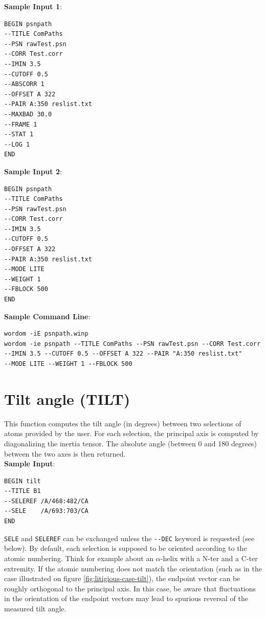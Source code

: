 \documentclass[11pt,twoside,onecolumn,a4paper,openright,notitlepage]{book}[2001/04/21]
\begin{document}
\textbf{\large Sample Input 1}:
\begin{verbatim}
BEGIN psnpath
--TITLE ComPaths
--PSN rawTest.psn
--CORR Test.corr
--IMIN 3.5
--CUTOFF 0.5
--ABSCORR 1
--OFFSET A 322
--PAIR A:350 reslist.txt
--MAXBAD 30.0
--FRAME 1
--STAT 1
--LOG 1
END
\end{verbatim}

\textbf{\large Sample Input 2}:
\begin{verbatim}
BEGIN psnpath
--TITLE ComPaths
--PSN rawTest.psn
--CORR Test.corr
--IMIN 3.5
--CUTOFF 0.5
--OFFSET A 322
--PAIR A:350 reslist.txt
--MODE LITE
--WEIGHT 1
--FBLOCK 500
END
\end{verbatim}

\textbf{\large Sample Command Line}:
\begin{verbatim}
wordom -iE psnpath.winp
wordom -ie psnpath --TITLE ComPaths --PSN rawTest.psn --CORR Test.corr 
--IMIN 3.5 --CUTOFF 0.5 --OFFSET A 322 --PAIR "A:350 reslist.txt" 
--MODE LITE --WEIGHT 1 --FBLOCK 500
\end{verbatim}

\clearpage


\section{Tilt angle (TILT)}

This function computes the tilt angle (in degrees) between two selections of atoms provided by the user. For each selection, the principal axis is computed by diagonalizing the inertia tensor. The absolute angle (between 0 and 180 degrees) between the two axes is then returned.\\

\textbf{\large Sample Input}:
\begin{verbatim}
BEGIN tilt
--TITLE B1
--SELEREF /A/468:482/CA
--SELE    /A/693:703/CA
END
\end{verbatim}

\verb!SELE! and \verb!SELEREF! can be exchanged unless the \verb!--DEC! keyword is requested (see below). By default, each selection is supposed to be oriented according to the atomic numbering. Think for example about an $\alpha$-helix with a N-ter and a C-ter extremity. If the atomic numbering does not match the orientation (such as in the case illustrated on figure \ref{fig:litigious-case-tilt}), the endpoint vector can be roughly orthogonal to the principal axis. In this case, be aware that fluctuations in the orientation of the endpoint vectors may lead to spurious reversal of the measured tilt angle.
\end{document}
